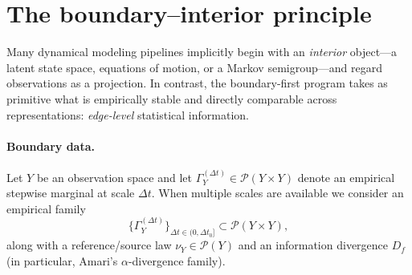 \documentclass[11pt]{article}
\providecommand{\Eref}[1]{\ref{E-#1}}
\begin{document}
\begin{abstract}
\subsection{Semigroup taxonomy from drift/noise scaling}
\label{subsec:semigroup-taxonomy}

In the LWLS construction the ``destination'' semigroup is determined by
the limiting generator, which is in turn controlled by the \emph{scaling
of drift and residual noise with $\Delta t$}. Different modeling choices
(and different empirical scaling regimes) therefore lead to different
familiar semigroup classes, summarized in
Table~\ref{tab:semigroup-taxonomy} (cf.\ Lemma~\Eref{lem:scaling-regimes-generator}).

\paragraph{Takeaway.}
The framework does not privilege a single interior dynamics class. It
explains which semigroup class is warranted by the \emph{boundary}
statistics (including scaling diagnostics), and it makes non-uniqueness
explicit when the boundary does not identify the interior uniquely.
explicit consistency and limiting conditions, rather than assumed a priori. This viewpoint offers a
systematic synthesis between reductionist and complexity approaches: reductionist structure is recovered
when completion succeeds; irreducible pluralism is acknowledged, but disciplined, when completion fails
or is non-unique. We also interpret Amari's $\alpha\in[-1,1]$ family of divergences as a parametric
family of \emph{empirical stances} governing which discrepancies are treated as epistemically costly,
and we propose practical diagnostics for selecting $\alpha$.
\end{abstract}

\section{The boundary--interior principle}
Many dynamical modeling pipelines implicitly begin with an \emph{interior} object---a latent state space,
equations of motion, or a Markov semigroup---and regard observations as a projection. In contrast, the
boundary-first program takes as primitive what is empirically stable and directly comparable across
representations: \emph{edge-level} statistical information.

\paragraph{Boundary data.}
Let $Y$ be an observation space and let $\Gamma_Y^{(\Delta t)} \in \mathcal P(Y\times Y)$ denote an
empirical stepwise marginal at scale $\Delta t$. When multiple scales are available we consider an
empirical family
\[
\{\Gamma_Y^{(\Delta t)}\}_{\Delta t\in(0,\Delta t_0]} \subset \mathcal P(Y\times Y),
\]
along with a reference/source law $\nu_Y\in\mathcal P(Y)$ and an information divergence $D_f$ (in
particular, Amari's $\alpha$-divergence family).
\end{document}
